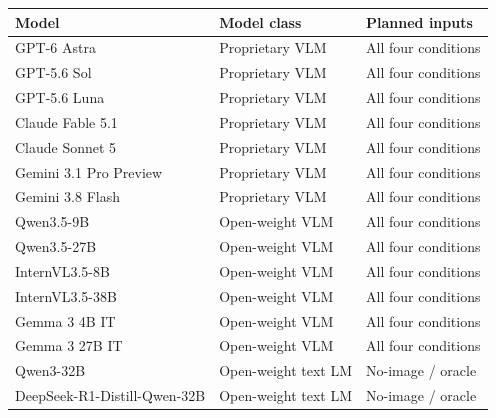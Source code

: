 \begin{tabular}{@{}lll@{}}
\toprule
Model & Model class & Planned inputs\\
\midrule
GPT-6 Astra & Proprietary VLM & All four conditions\\
GPT-5.6 Sol & Proprietary VLM & All four conditions\\
GPT-5.6 Luna & Proprietary VLM & All four conditions\\
Claude Fable 5.1 & Proprietary VLM & All four conditions\\
Claude Sonnet 5 & Proprietary VLM & All four conditions\\
Gemini 3.1 Pro Preview & Proprietary VLM & All four conditions\\
Gemini 3.8 Flash & Proprietary VLM & All four conditions\\
Qwen3.5-9B & Open-weight VLM & All four conditions\\
Qwen3.5-27B & Open-weight VLM & All four conditions\\
InternVL3.5-8B & Open-weight VLM & All four conditions\\
InternVL3.5-38B & Open-weight VLM & All four conditions\\
Gemma 3 4B IT & Open-weight VLM & All four conditions\\
Gemma 3 27B IT & Open-weight VLM & All four conditions\\
Qwen3-32B & Open-weight text LM & No-image / oracle\\
DeepSeek-R1-Distill-Qwen-32B & Open-weight text LM & No-image / oracle\\
\bottomrule
\end{tabular}
